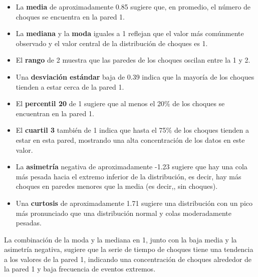 \documentclass[11pt]{article} %
\begin{document}
\begin{itemize}
	\item La \textbf{media} de aproximadamente 0.85 sugiere que, en promedio, el número de choques se encuentra en la pared 1.
	\item La \textbf{mediana} y la \textbf{moda} iguales a 1 reflejan que el valor más comúnmente observado y el valor central de la distribución de choques es 1.
	\item El \textbf{rango} de 2 muestra que las paredes de los choques oscilan entre la 1 y 2.
	\item Una \textbf{desviación estándar} baja de 0.39 indica que la mayoría de los choques tienden a estar cerca de la pared 1.
	\item El \textbf{percentil 20} de 1 sugiere que al menos el 20\% de los choques se encuentran en la pared 1.
	\item El \textbf{cuartil 3} también de 1 indica que hasta el 75\% de los choques tienden a estar en esta pared, mostrando una alta concentración de los datos en este valor.
	\item La \textbf{asimetría} negativa de aproximadamente -1.23 sugiere que hay una cola más pesada hacia el extremo inferior de la distribución, es decir, hay más choques en paredes menores que la media (es decir,, sin choques).
	\item Una \textbf{curtosis} de aproximadamente 1.71 sugiere una distribución con un pico más pronunciado que una distribución normal y colas moderadamente pesadas.
\end{itemize}

La combinación de la moda y la mediana en 1, junto con la baja media y la asimetría negativa, sugiere que la serie de tiempo de choques tiene una tendencia a los valores de la pared 1, indicando una concentración de choques alrededor de la pared 1 y baja frecuencia de eventos extremos.
\end{document}
